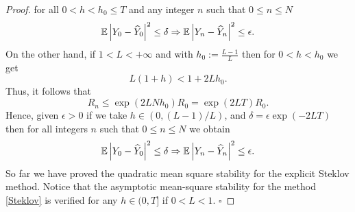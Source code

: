 \begin{proof}
			for all $0<h<h_0\leq T$ and any integer $n$ such that $0\leq n \leq N$
		\begin{equation*}
			\mathbb{E}\left|Y_0-\widehat{Y}_0\right|^2\leq \delta 
			\Rightarrow
			\mathbb{E}\left|Y_n-\widehat{Y}_n\right|^2\leq \epsilon.
		\end{equation*}
		On the other hand, if $1<L<+\infty$ and with $h_0:=\frac{L-1}{L}$ then for $0<h<h_0$
		we get
		$$
			L(1+h)<1+2Lh_0.
		$$
		Thus, it follows that
		\begin{equation*}
			R_n\leq \exp(2LNh_0)R_0
			=\exp(2LT)R_0.
		\end{equation*}
		Hence, given $\epsilon>0$ if we take $h\in(0,(L-1)/L)$, and 
		$\delta=\epsilon \exp(-2LT)$ then for all integers $n$ such 
		that $0\leq n \leq N$ we obtain
		\begin{equation*}
			\mathbb{E}\left|Y_0-\widehat{Y}_0\right|^2\leq \delta
			\Rightarrow
			\mathbb{E}\left|Y_n-\widehat{Y}_n\right|^2\leq \epsilon.
		\end{equation*}
		So far we have proved the quadratic mean square stability for the explicit Steklov
		method. Notice that the asymptotic mean-square stability for the method
		\eqref{Steklov} is verified for  any $h\in(0,T]$ if $0<L<1$. $\square$
	\end{proof}

